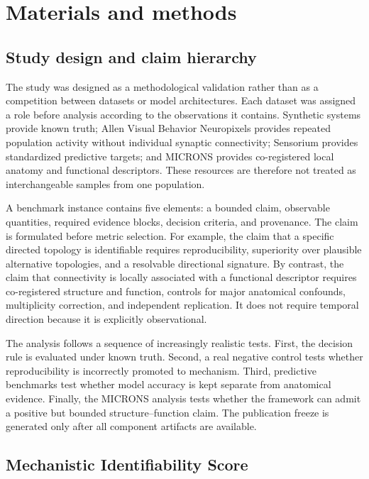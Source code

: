 \section{Materials and methods}

\subsection{Study design and claim hierarchy}

The study was designed as a methodological validation rather than as a
competition between datasets or model architectures. Each dataset was assigned
a role before analysis according to the observations it contains. Synthetic
systems provide known truth; Allen Visual Behavior Neuropixels provides repeated
population activity without individual synaptic connectivity; Sensorium
provides standardized predictive targets; and MICRONS provides co-registered
local anatomy and functional descriptors. These resources are therefore not
treated as interchangeable samples from one population.

A benchmark instance contains five elements: a bounded claim, observable
quantities, required evidence blocks, decision criteria, and provenance. The
claim is formulated before metric selection. For example, the claim that a
specific directed topology is identifiable requires reproducibility, superiority
over plausible alternative topologies, and a resolvable directional signature.
By contrast, the claim that connectivity is locally associated with a functional
descriptor requires co-registered structure and function, controls for major
anatomical confounds, multiplicity correction, and independent replication. It
does not require temporal direction because it is explicitly observational.

The analysis follows a sequence of increasingly realistic tests. First, the
decision rule is evaluated under known truth. Second, a real negative control
tests whether reproducibility is incorrectly promoted to mechanism. Third,
predictive benchmarks test whether model accuracy is kept separate from
anatomical evidence. Finally, the MICRONS analysis tests whether the framework
can admit a positive but bounded structure--function claim. The publication
freeze is generated only after all component artifacts are available.

\subsection{Mechanistic Identifiability Score}

